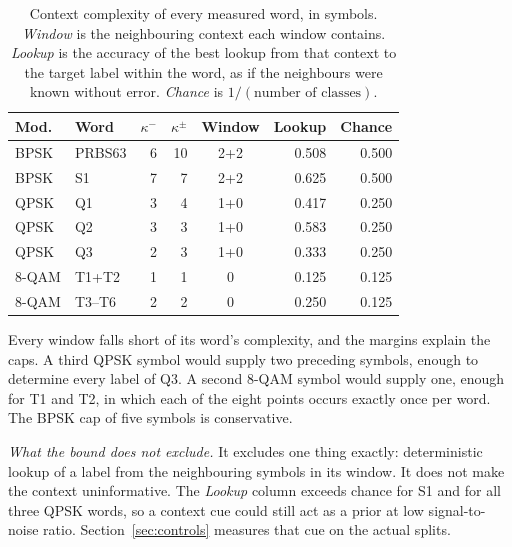 \documentclass{ieeeaccess}
\begin{document}
\begin{table}[!t]
\caption{Context complexity of every measured word, in symbols. \emph{Window}
is the neighbouring context each window contains. \emph{Lookup} is the
accuracy of the best lookup from that context to the target label within the
word, as if the neighbours were known without error. \emph{Chance} is
$1/(\text{number of classes})$.}
\label{tab:context}
\centering
\begin{tabular}{llrrcrr}
\toprule
Mod. & Word & $\kappa^{-}$ & $\kappa^{\pm}$ & Window & Lookup & Chance \\
\midrule
BPSK  & PRBS63 & 6 & 10 & 2+2 & 0.508 & 0.500 \\
BPSK  & S1     & 7 &  7 & 2+2 & 0.625 & 0.500 \\
QPSK  & Q1     & 3 &  4 & 1+0 & 0.417 & 0.250 \\
QPSK  & Q2     & 3 &  3 & 1+0 & 0.583 & 0.250 \\
QPSK  & Q3     & 2 &  3 & 1+0 & 0.333 & 0.250 \\
8-QAM & T1+T2  & 1 &  1 & 0   & 0.125 & 0.125 \\
8-QAM & T3--T6 & 2 &  2 & 0   & 0.250 & 0.125 \\
\bottomrule
\end{tabular}
\end{table}

Every window falls short of its word's complexity, and the margins explain the
caps. A third QPSK symbol would supply two preceding symbols, enough to
determine every label of Q3. A second 8-QAM symbol would supply one, enough for
T1 and T2, in which each of the eight points occurs exactly once per word. The
BPSK cap of five symbols is conservative.

\emph{What the bound does not exclude.} It excludes one thing exactly:
deterministic lookup of a label from the neighbouring symbols in its window. It
does not make the context uninformative. The \emph{Lookup} column exceeds
chance for S1 and for all three QPSK words, so a context cue could still act as
a prior at low signal-to-noise ratio. Section~\ref{sec:controls} measures that
cue on the actual splits.
\end{document}
